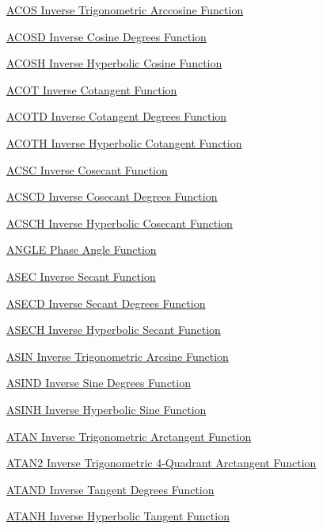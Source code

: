 
\begin{DoxyItemize}
\item \hyperlink{mathfunctions_acos}{A\-C\-O\-S Inverse Trigonometric Arccosine Function}  
\item \hyperlink{mathfunctions_acosd}{A\-C\-O\-S\-D Inverse Cosine Degrees Function}  
\item \hyperlink{mathfunctions_acosh}{A\-C\-O\-S\-H Inverse Hyperbolic Cosine Function}  
\item \hyperlink{mathfunctions_acot}{A\-C\-O\-T Inverse Cotangent Function}  
\item \hyperlink{mathfunctions_acotd}{A\-C\-O\-T\-D Inverse Cotangent Degrees Function}  
\item \hyperlink{mathfunctions_acoth}{A\-C\-O\-T\-H Inverse Hyperbolic Cotangent Function}  
\item \hyperlink{mathfunctions_acsc}{A\-C\-S\-C Inverse Cosecant Function}  
\item \hyperlink{mathfunctions_acscd}{A\-C\-S\-C\-D Inverse Cosecant Degrees Function}  
\item \hyperlink{mathfunctions_acsch}{A\-C\-S\-C\-H Inverse Hyperbolic Cosecant Function}  
\item \hyperlink{mathfunctions_angle}{A\-N\-G\-L\-E Phase Angle Function}  
\item \hyperlink{mathfunctions_asec}{A\-S\-E\-C Inverse Secant Function}  
\item \hyperlink{mathfunctions_asecd}{A\-S\-E\-C\-D Inverse Secant Degrees Function}  
\item \hyperlink{mathfunctions_asech}{A\-S\-E\-C\-H Inverse Hyperbolic Secant Function}  
\item \hyperlink{mathfunctions_asin}{A\-S\-I\-N Inverse Trigonometric Arcsine Function}  
\item \hyperlink{mathfunctions_asind}{A\-S\-I\-N\-D Inverse Sine Degrees Function}  
\item \hyperlink{mathfunctions_asinh}{A\-S\-I\-N\-H Inverse Hyperbolic Sine Function}  
\item \hyperlink{mathfunctions_atan}{A\-T\-A\-N Inverse Trigonometric Arctangent Function}  
\item \hyperlink{mathfunctions_atan2}{A\-T\-A\-N2 Inverse Trigonometric 4-\/\-Quadrant Arctangent Function}  
\item \hyperlink{mathfunctions_atand}{A\-T\-A\-N\-D Inverse Tangent Degrees Function}  
\item \hyperlink{mathfunctions_atanh}{A\-T\-A\-N\-H Inverse Hyperbolic Tangent Function}  

\end{DoxyItemize}
